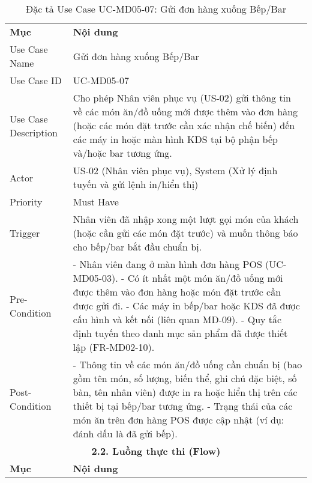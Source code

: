 \begin{longtable}{|m{4cm}|p{11cm}|}
\caption{Đặc tả Use Case UC-MD05-07: Gửi đơn hàng xuống Bếp/Bar} \label{tab:uc_md05_07} \\
\hline

\endhead %
\hline
\endfoot %
\hline
\endlastfoot %
\multicolumn{2}{|c|}{\textbf{2.1. Tóm tắt (Summary)}} \\
\hline
\textbf{Mục} & \textbf{Nội dung} \\
\hline
Use Case Name & Gửi đơn hàng xuống Bếp/Bar \\
\hline
Use Case ID & UC-MD05-07 \\
\hline
Use Case Description & Cho phép Nhân viên phục vụ (US-02) gửi thông tin về các món ăn/đồ uống mới được thêm vào đơn hàng (hoặc các món đặt trước cần xác nhận chế biến) đến các máy in hoặc màn hình KDS tại bộ phận bếp và/hoặc bar tương ứng. \\
\hline
Actor & US-02 (Nhân viên phục vụ), System (Xử lý định tuyến và gửi lệnh in/hiển thị) \\
\hline
Priority & Must Have \\
\hline
Trigger & Nhân viên đã nhập xong một lượt gọi món của khách (hoặc cần gửi các món đặt trước) và muốn thông báo cho bếp/bar bắt đầu chuẩn bị. \\
\hline
Pre-Condition & - Nhân viên đang ở màn hình đơn hàng POS (UC-MD05-03). \newline - Có ít nhất một món ăn/đồ uống mới được thêm vào đơn hàng hoặc món đặt trước cần được gửi đi. \newline - Các máy in bếp/bar hoặc KDS đã được cấu hình và kết nối (liên quan MD-09). \newline - Quy tắc định tuyến theo danh mục sản phẩm đã được thiết lập (FR-MD02-10). \\
\hline
Post-Condition & - Thông tin về các món ăn/đồ uống cần chuẩn bị (bao gồm tên món, số lượng, biến thể, ghi chú đặc biệt, số bàn, tên nhân viên) được in ra hoặc hiển thị trên các thiết bị tại bếp/bar tương ứng. \newline - Trạng thái của các món ăn trên đơn hàng POS được cập nhật (ví dụ: đánh dấu là đã gửi bếp). \\
\hline
\multicolumn{2}{|c|}{\textbf{2.2. Luồng thực thi (Flow)}} \\
\hline
\textbf{Mục} & \textbf{Nội dung} \\
\hline

\end{longtable}
